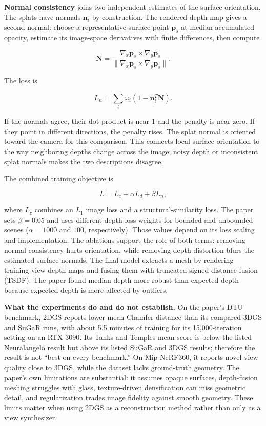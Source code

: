 \textbf{Normal consistency} joins two independent estimates of the surface orientation. The splats have normals \(\mathbf{n}_i\) by construction. The rendered depth map gives a second normal: choose a representative surface point \(\mathbf{p}_s\) at median accumulated opacity, estimate its image-space derivatives with finite differences, then compute

\[\mathbf{N}=\frac{\nabla_x\mathbf{p}_s\times\nabla_y\mathbf{p}_s}{\|\nabla_x\mathbf{p}_s\times\nabla_y\mathbf{p}_s\|}.\]

The loss is

\[L_n=\sum_i\omega_i(1-\mathbf{n}_i^T\mathbf{N}).\]

If the normals agree, their dot product is near 1 and the penalty is near zero. If they point in different directions, the penalty rises. The splat normal is oriented toward the camera for this comparison. This connects local surface orientation to the way neighboring depths change across the image; noisy depth or inconsistent splat normals makes the two descriptions disagree.

The combined training objective is

\[L=L_c+\alpha L_d+\beta L_n,\]

where \(L_c\) combines an \(L_1\) image loss and a structural-similarity loss. The paper sets \(\beta=0.05\) and uses different depth-loss weights for bounded and unbounded scenes (\(\alpha=1000\) and \(100\), respectively). Those values depend on its loss scaling and implementation. The ablations support the role of both terms: removing normal consistency hurts orientation, while removing depth distortion blurs the estimated surface normals. The final model extracts a mesh by rendering training-view depth maps and fusing them with truncated signed-distance fusion (TSDF). The paper found median depth more robust than expected depth because expected depth is more affected by outliers.

\textbf{What the experiments do and do not establish.} On the paper's DTU benchmark, 2DGS reports lower mean Chamfer distance than its compared 3DGS and SuGaR runs, with about 5.5 minutes of training for its 15,000-iteration setting on an RTX 3090. Its Tanks and Temples mean score is below the listed Neuralangelo result but above its listed SuGaR and 3DGS results; therefore the result is not ``best on every benchmark.'' On Mip-NeRF360, it reports novel-view quality close to 3DGS, while the dataset lacks ground-truth geometry. The paper's own limitations are substantial: it assumes opaque surfaces, depth-fusion meshing struggles with glass, texture-driven densification can miss geometric detail, and regularization trades image fidelity against smooth geometry. These limits matter when using 2DGS as a reconstruction method rather than only as a view synthesizer.

